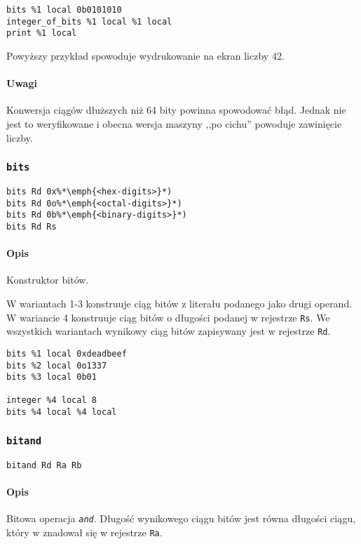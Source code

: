 \begin{lstlisting}
bits %1 local 0b0101010
integer_of_bits %1 local %1 local
print %1 local
\end{lstlisting}

Powyższy przykład spowoduje wydrukowanie na ekran liczby 42.

\paragraph*{Uwagi}

Konwersja ciągów dłuższych niż 64 bity powinna spowodować błąd. Jednak nie jest
to weryfikowane i obecna wersja maszyny ,,po cichu'' powoduje zawinięcie liczby.

\subsubsection{\texttt{bits}}

\begin{lstlisting}
bits Rd 0x%*\emph{<hex-digits>}*)
bits Rd 0o%*\emph{<octal-digits>}*)
bits Rd 0b%*\emph{<binary-digits>}*)
bits Rd Rs
\end{lstlisting}

\paragraph*{Opis} Konstruktor bitów.

W wariantach 1-3 konstruuje ciąg bitów z literału podanego jako drugi operand.
W wariancie 4 konstruuje ciąg bitów o długości podanej w rejestrze \texttt{Rs}.
We wszystkich wariantach wynikowy ciąg bitów zapisywany jest w rejestrze
\texttt{Rd}.

\begin{lstlisting}
bits %1 local 0xdeadbeef
bits %2 local 0o1337
bits %3 local 0b01

integer %4 local 8
bits %4 local %4 local
\end{lstlisting}

\subsubsection{\texttt{bitand}}

\begin{lstlisting}
bitand Rd Ra Rb
\end{lstlisting}

\paragraph*{Opis} Bitowa operacja \emph{\texttt{and}}.
Długość wynikowego ciągu bitów jest równa długości ciągu, który w znadował się w
rejestrze \texttt{Ra}.


